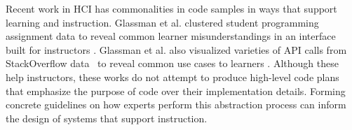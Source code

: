 

Recent work in HCI has  commonalities in code samples in ways that support learning and instruction. Glassman et al. clustered student programming assignment data to reveal common learner misunderstandings in an interface built for instructors \cite{glassman2015studentsolutions}. 
Glassman et al. also visualized varieties of API calls from StackOverflow data~\cite{Zhang_StackOverflowAPIMining_ICSE-2018} to reveal common use cases to learners \cite{glassman2018visualizingapi}.  
Although these  help instructors, these works do not attempt to produce high-level code plans that emphasize the purpose of code over their implementation details. 
Forming concrete guidelines on how experts perform this abstraction process can inform the design of systems that support instruction.


